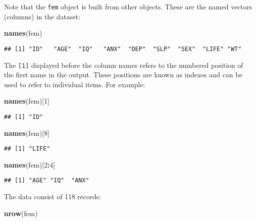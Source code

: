 \documentclass[]{book}
\newenvironment{Shaded}{\begin{snugshade}}{\end{snugshade}}
\newcommand{\KeywordTok}[1]{\textcolor[rgb]{0.13,0.29,0.53}{\textbf{#1}}}
\newcommand{\DecValTok}[1]{\textcolor[rgb]{0.00,0.00,0.81}{#1}}
\newcommand{\OperatorTok}[1]{\textcolor[rgb]{0.81,0.36,0.00}{\textbf{#1}}}
\newcommand{\NormalTok}[1]{#1}
\theoremstyle{definition}
\theoremstyle{definition}
\theoremstyle{definition}
\theoremstyle{remark}
\begin{document}
Note that the \texttt{fem} object is built from other objects. These are
the named vectors (columns) in the dataset:

\begin{Shaded}
\begin{Highlighting}[]
\KeywordTok{names}\NormalTok{(fem)}
\end{Highlighting}
\end{Shaded}

\begin{verbatim}
## [1] "ID"   "AGE"  "IQ"   "ANX"  "DEP"  "SLP"  "SEX"  "LIFE" "WT"
\end{verbatim}

The \texttt{{[}1{]}} displayed before the column names refers to the
numbered position of the first name in the output. These positions are
known as indexes and can be used to refer to individual items. For
example:

\begin{Shaded}
\begin{Highlighting}[]
\KeywordTok{names}\NormalTok{(fem)[}\DecValTok{1}\NormalTok{]}
\end{Highlighting}
\end{Shaded}

\begin{verbatim}
## [1] "ID"
\end{verbatim}

\begin{Shaded}
\begin{Highlighting}[]
\KeywordTok{names}\NormalTok{(fem)[}\DecValTok{8}\NormalTok{]}
\end{Highlighting}
\end{Shaded}

\begin{verbatim}
## [1] "LIFE"
\end{verbatim}

\begin{Shaded}
\begin{Highlighting}[]
\KeywordTok{names}\NormalTok{(fem)[}\DecValTok{2}\OperatorTok{:}\DecValTok{4}\NormalTok{]}
\end{Highlighting}
\end{Shaded}

\begin{verbatim}
## [1] "AGE" "IQ"  "ANX"
\end{verbatim}

The data consist of 118 records:

\begin{Shaded}
\begin{Highlighting}[]
\KeywordTok{nrow}\NormalTok{(fem)}
\end{Highlighting}
\end{Shaded}
\end{document}
